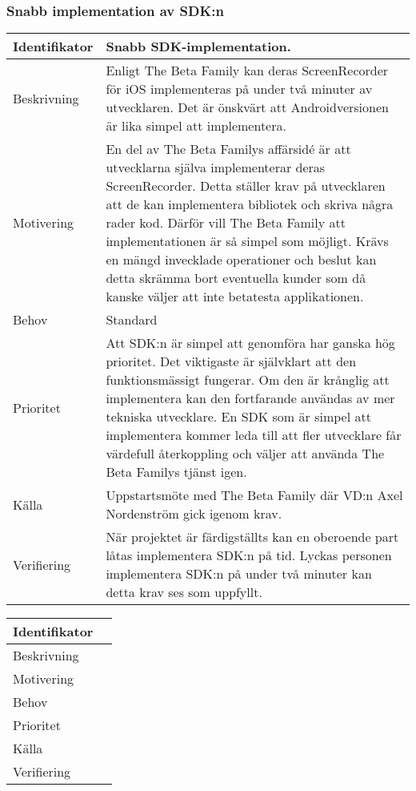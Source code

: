 \subsubsection{Snabb implementation av SDK:n}
\begin{tabular}{ | p{65pt} | p{300pt} |}
  \hline
  Identifikator &
  Snabb SDK-implementation.
  \\ \hline
  Beskrivning & 
  Enligt The Beta Family kan deras ScreenRecorder för iOS implementeras på under två minuter av utvecklaren. Det är önskvärt att Androidversionen är lika simpel att implementera.
  \\ \hline
  Motivering &
  En del av The Beta Familys affärsidé är att utvecklarna själva implementerar deras ScreenRecorder. Detta ställer krav på utvecklaren att de kan implementera bibliotek och skriva några rader kod. Därför vill The Beta Family att implementationen är så simpel som möjligt. Krävs en mängd invecklade operationer och beslut kan detta skrämma bort eventuella kunder som då kanske väljer att inte betatesta applikationen.
  \\ \hline
  Behov &
  Standard
  \\ \hline
  Prioritet &
  Att SDK:n är simpel att genomföra har ganska hög prioritet. Det viktigaste är självklart att den funktionsmässigt fungerar. Om den är krånglig att implementera kan den fortfarande användas av mer tekniska utvecklare. En SDK som är simpel att implementera kommer leda till att fler utvecklare får värdefull återkoppling och väljer att använda The Beta Familys tjänst igen.
  \\ \hline
  Källa &
  Uppstartsmöte med The Beta Family där VD:n Axel Nordenström gick igenom krav.
  \\ \hline
  Verifiering &
  När projektet är färdigställts kan en oberoende part låtas implementera SDK:n på tid. Lyckas personen implementera SDK:n på under två minuter kan detta krav ses som uppfyllt.
  \\ \hline
\end{tabular}

\begin{tabular}{ | p{65pt} | p{300pt} |}
  \hline
  Identifikator &
  \\ \hline
  Beskrivning & 
  \\ \hline
  Motivering &
  \\ \hline
  Behov &
  \\ \hline
  Prioritet &
  \\ \hline
  Källa &
  \\ \hline
  Verifiering &
  \\ \hline
\end{tabular}
